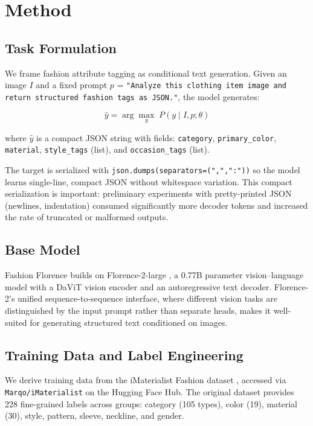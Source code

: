 \documentclass[10pt,twocolumn]{article}
\begin{document}
\section{Method}
\label{sec:method}

\subsection{Task Formulation}

We frame fashion attribute tagging as conditional text generation.  Given an
image $I$ and a fixed prompt $p$ = \texttt{"Analyze this clothing item image
and return structured fashion tags as JSON."}, the model generates:

\begin{equation}
  \hat{y} = \arg\max_y \; P(y \mid I, p; \theta)
\end{equation}

\noindent where $\hat{y}$ is a compact JSON string with fields:
\texttt{category}, \texttt{primary\_color}, \texttt{material},
\texttt{style\_tags} (list), and \texttt{occasion\_tags} (list).

The target is serialized with \texttt{json.dumps(separators=(",",":"))} so
the model learns single-line, compact JSON without whitespace variation.
This compact serialization is important: preliminary experiments with
pretty-printed JSON (newlines, indentation) consumed significantly more
decoder tokens and increased the rate of truncated or malformed outputs.

\subsection{Base Model}

Fashion Florence builds on Florence-2-large \citep{xiao2024florence2}, a
0.77B parameter vision--language model with a DaViT vision encoder and an
autoregressive text decoder.  Florence-2's unified sequence-to-sequence
interface, where different vision tasks are distinguished by the input
prompt rather than separate heads, makes it well-suited for generating
structured text conditioned on images.

\subsection{Training Data and Label Engineering}
\label{sec:labels}

We derive training data from the iMaterialist Fashion dataset
\citep{guo2019imaterialist}, accessed via \texttt{Marqo/iMaterialist} on the
Hugging Face Hub.  The original dataset provides 228 fine-grained labels
across groups: category (105 types), color (19), material (30), style,
pattern, sleeve, neckline, and gender.
\end{document}
